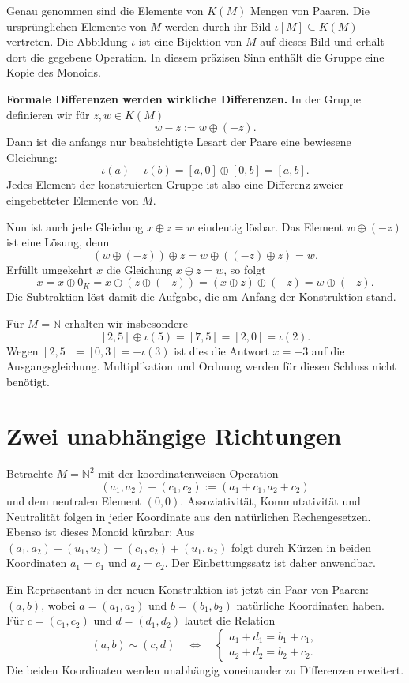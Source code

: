 \DifferencesEmbeddingDiagram

Genau genommen sind die Elemente von \(K(M)\) Mengen von
Paaren. Die ursprünglichen Elemente von \(M\) werden durch
ihr Bild \(\iota[M]\subseteq K(M)\) vertreten. Die
Abbildung \(\iota\) ist eine Bijektion von \(M\) auf dieses
Bild und erhält dort die gegebene Operation. In diesem präzisen
Sinn enthält die Gruppe eine Kopie des Monoids.

\medskip\noindent\textbf{Formale Differenzen werden wirkliche Differenzen.}
In der Gruppe definieren wir für \(z,w\in K(M)\)
\[
  w-z:=w\oplus(-z).
\]
Dann ist die anfangs nur beabsichtigte Lesart der Paare eine
bewiesene Gleichung:
\[
  \iota(a)-\iota(b)
    =[a,0]\oplus[0,b]=[a,b].
\]
Jedes Element der konstruierten Gruppe ist also eine Differenz
zweier eingebetteter Elemente von \(M\).

Nun ist auch jede Gleichung \(x\oplus z=w\) eindeutig
lösbar. Das Element \(w\oplus(-z)\) ist eine Lösung, denn
\[
  (w\oplus(-z))\oplus z
    =w\oplus((-z)\oplus z)=w.
\]
Erfüllt umgekehrt \(x\) die Gleichung \(x\oplus z=w\), so folgt
\[
  x=x\oplus0_K
    =x\oplus(z\oplus(-z))
    =(x\oplus z)\oplus(-z)=w\oplus(-z).
\]
Die Subtraktion löst damit die Aufgabe, die am Anfang der
Konstruktion stand.

Für \(M=\mathbb N\) erhalten wir insbesondere
\[
  [2,5]\oplus\iota(5)=[7,5]=[2,0]=\iota(2).
\]
Wegen \([2,5]=[0,3]=-\iota(3)\) ist dies die Antwort
\(x=-3\) auf die Ausgangsgleichung. Multiplikation und Ordnung
werden für diesen Schluss nicht benötigt.

\par{}
\hypertarget{differences.reading.product}{}
\section*{Zwei unabhängige Richtungen}

Betrachte \(M=\mathbb N^2\) mit der koordinatenweisen Operation
\[
  (a_1,a_2)+(c_1,c_2):=(a_1+c_1,a_2+c_2)
\]
und dem neutralen Element \((0,0)\). Assoziativität,
Kommutativität und Neutralität folgen in jeder Koordinate aus
den natürlichen Rechengesetzen. Ebenso ist dieses Monoid kürzbar:
Aus \((a_1,a_2)+(u_1,u_2)=(c_1,c_2)+(u_1,u_2)\) folgt
durch Kürzen in beiden Koordinaten \(a_1=c_1\) und \(a_2=c_2\).
Der Einbettungssatz ist daher anwendbar.

Ein Repräsentant in der neuen Konstruktion ist jetzt ein Paar
von Paaren: \((a,b)\), wobei \(a=(a_1,a_2)\) und
\(b=(b_1,b_2)\) natürliche Koordinaten haben. Für
\(c=(c_1,c_2)\) und \(d=(d_1,d_2)\) lautet die Relation
\[
  (a,b)\sim(c,d)
  \quad\Longleftrightarrow\quad
  \begin{cases}
    a_1+d_1=b_1+c_1,\\
    a_2+d_2=b_2+c_2.
  \end{cases}
\]
Die beiden Koordinaten werden unabhängig voneinander zu
Differenzen erweitert.

